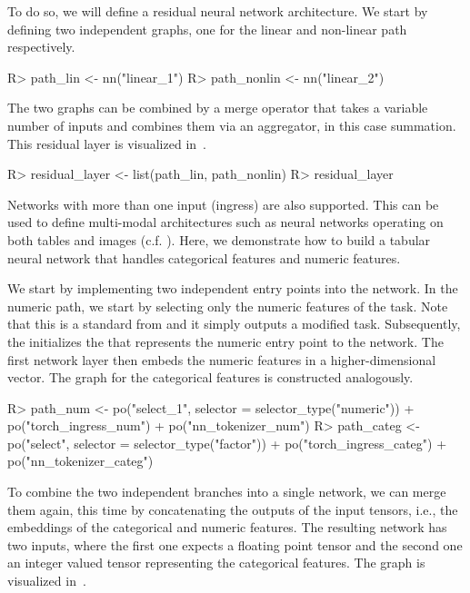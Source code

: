 \documentclass[article]{jss}
\theoremstyle{definition}
\begin{document}
To do so, we will define a residual neural network architecture.
We start by defining two independent graphs, one for the linear and non-linear path respectively.

\begin{CodeInput}
R> path_lin <- nn("linear_1")
R> path_nonlin <- nn("linear_2") %
\end{CodeInput}

The two graphs can be combined by a merge operator that takes a variable number of inputs and combines them via an aggregator, in this case summation.
This residual layer is visualized in~.

\begin{CodeInput}
R> residual_layer <- list(path_lin, path_nonlin) %
R> residual_layer
\end{CodeInput}


Networks with more than one input (ingress) are also supported.
This can be used to define multi-modal architectures such as neural networks operating on both tables and images (c.f. ).
Here, we demonstrate how to build a tabular neural network that handles categorical features and numeric features.

We start by implementing two independent entry points into the network.
In the numeric path, we start by selecting only the numeric features of the task.
Note that this is a standard  from  and it simply outputs a modified task.
Subsequently, the  initializes the  that represents the numeric entry point to the network.
The first network layer then embeds the numeric features in a higher-dimensional vector.
The graph for the categorical features is constructed analogously.


\begin{CodeInput}
R> path_num <- po("select_1", selector = selector_type("numeric")) %
+    po("torch_ingress_num") %
+    po("nn_tokenizer_num")
R> path_categ <- po("select", selector = selector_type("factor")) %
+    po("torch_ingress_categ") %
+    po("nn_tokenizer_categ")
\end{CodeInput}

To combine the two independent branches into a single network, we can merge them again, this time by concatenating the outputs of the input tensors, i.e., the embeddings of the categorical and numeric features.
The resulting network has two inputs, where the first one expects a floating point tensor and the second one an integer valued tensor representing the categorical features.
The graph is visualized in~.
\end{document}
